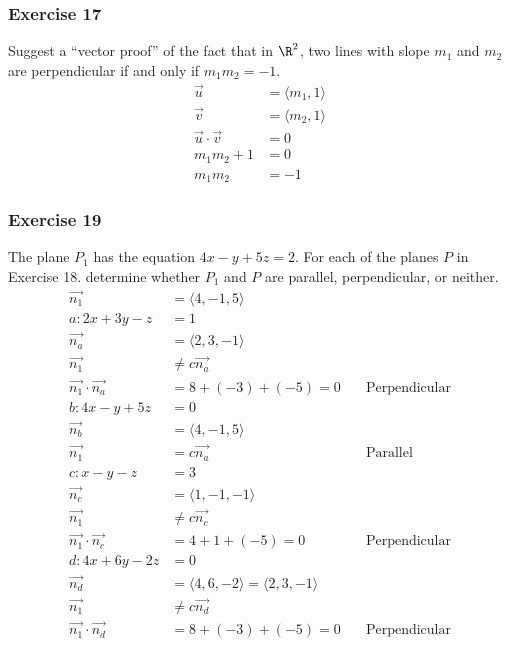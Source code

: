 \documentclass{math}
\begin{document}
\subsubsection*{Exercise 17}
Suggest a ``vector proof'' of the fact that in \( \R^2 \), two lines with slope
\( m_1 \) and \( m_2 \) are perpendicular if and only if \( m_1m_2 = -1 \).
\begin{align*}
  \vec{u} &= \langle m_1,1\rangle \\
  \vec{v} &= \langle m_2,1\rangle \\
  \vec{u}\cdot\vec{v} &= 0 \\
  m_1m_2+1 &= 0 \\
  m_1m_2 &= -1
\end{align*}

\subsubsection*{Exercise 19}
The plane \( P_1 \) has the equation \( 4x-y+5z = 2 \). For each
of the planes \( P \) in Exercise 18. determine whether \( P_1 \) and \( P \)
are parallel, perpendicular, or neither.
\begin{align*}
  \vec{n_1} &= \langle4,-1,5\rangle \\
  a: 2x+3y-z &= 1 \\
  \vec{n_a} &= \langle2,3,-1\rangle \\
  \vec{n_1} &\ne c\vec{n_a} \\
  \vec{n_1}\cdot\vec{n_a} &= 8+(-3)+(-5) = 0 \quad &\text{Perpendicular} \\
  b: 4x-y+5z &= 0 \\
  \vec{n_b} &= \langle4,-1,5\rangle \\
  \vec{n_1} &= c\vec{n_a} \quad &\text{Parallel} \\
  c: x-y-z &= 3 \\
  \vec{n_c} &= \langle1,-1,-1\rangle \\
  \vec{n_1} &\ne c\vec{n_c} \\
  \vec{n_1}\cdot\vec{n_c} &= 4+1+(-5) = 0 \quad &\text{Perpendicular} \\
  d: 4x+6y-2z &= 0 \\
  \vec{n_d} &= \langle4,6,-2\rangle = \langle2,3,-1\rangle \\
  \vec{n_1} &\ne c\vec{n_d} \\
  \vec{n_1}\cdot\vec{n_d} &= 8+(-3)+(-5) = 0 \quad &\text{Perpendicular}
\end{align*}
\end{document}
